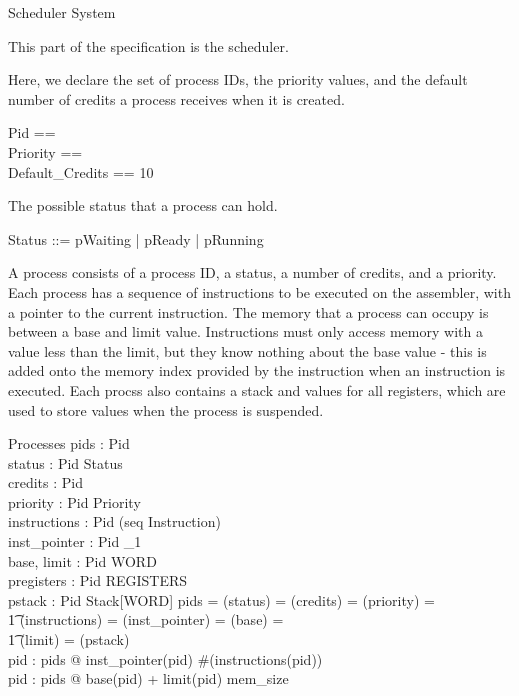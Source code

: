 \zpagebreak

\begin{zsection}
    \SECTION Scheduler
    \parents System
\end{zsection}

This part of the specification is the scheduler.

Here, we declare the set of process IDs, the priority values, and the
default number of credits a process receives when it is created.

\begin{zed}
    Pid == \nat\\
    Priority ==  \\
    Default\_Credits == 10 
\end{zed}

The possible status that a process can hold.

\begin{zed}
    Status ::= pWaiting | pReady | pRunning
\end{zed}

A process consists of a process ID, a status, a number of credits, and
a priority. Each process has a sequence of instructions to be executed
on the assembler, with a pointer to the current instruction. The
memory that a process can occupy is between a base and limit
value. Instructions must only access memory with a value less than the
limit, but they know nothing about the base value - this is added onto
the memory index provided by the instruction when an instruction is
executed. Each procss also contains a stack and values for all
registers, which are used to store values when the process is
suspended.

\begin{schema}{Processes}
    pids : \power Pid\\
    status : Pid \pfun Status\\
    credits : Pid \pfun \nat\\
    priority : Pid \pfun Priority\\
    instructions : Pid \pfun (seq Instruction)\\
    inst\_pointer : Pid \pfun \nat_1\\    
    base, limit : Pid \pfun WORD\\
    pregisters : Pid \pfun REGISTERS\\
    pstack : Pid \pfun Stack[WORD]
\where
    pids = \dom(status) = \dom(credits) = \dom(priority) =\\
	\t1 \dom(instructions) = \dom(inst\_pointer) = \dom(base) =\\
	\t1 \dom(limit) = \dom(pstack)\\
    \forall pid : pids @ inst\_pointer(pid) \leq \#(instructions(pid))\\
    \forall pid : pids @ base(pid) + limit(pid) \leq mem\_size
\end{schema}

